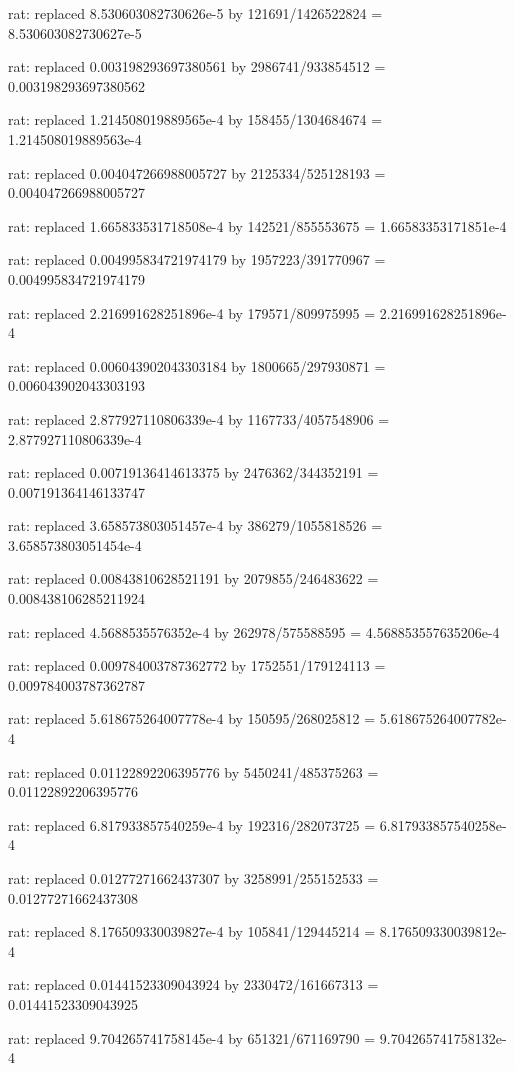 \documentclass[a4paper,10pt]{article}
\begin{document}
\begin{eulernotebook}
\begin{eulercomment}
\begin{eulercomment}
\begin{eulercomment}
\begin{eulercomment}
\begin{eulercomment}
\begin{eulercomment}
\begin{eulercomment}
\begin{eulercomment}
\begin{eulercomment}
\begin{eulercomment}
\begin{eulercomment}
\begin{eulercomment}
\begin{eulercomment}
\begin{eulercomment}
\begin{eulercomment}
\begin{eulercomment}
\begin{euleroutput}
  rat: replaced 8.530603082730626e-5 by 121691/1426522824 = 8.530603082730627e-5
  
  rat: replaced 0.003198293697380561 by 2986741/933854512 = 0.003198293697380562
  
  rat: replaced 1.214508019889565e-4 by 158455/1304684674 = 1.214508019889563e-4
  
  rat: replaced 0.004047266988005727 by 2125334/525128193 = 0.004047266988005727
  
  rat: replaced 1.665833531718508e-4 by 142521/855553675 = 1.66583353171851e-4
  
  rat: replaced 0.004995834721974179 by 1957223/391770967 = 0.004995834721974179
  
  rat: replaced 2.216991628251896e-4 by 179571/809975995 = 2.216991628251896e-4
  
  rat: replaced 0.006043902043303184 by 1800665/297930871 = 0.006043902043303193
  
  rat: replaced 2.877927110806339e-4 by 1167733/4057548906 = 2.877927110806339e-4
  
  rat: replaced 0.00719136414613375 by 2476362/344352191 = 0.007191364146133747
  
  rat: replaced 3.658573803051457e-4 by 386279/1055818526 = 3.658573803051454e-4
  
  rat: replaced 0.00843810628521191 by 2079855/246483622 = 0.008438106285211924
  
  rat: replaced 4.5688535576352e-4 by 262978/575588595 = 4.568853557635206e-4
  
  rat: replaced 0.009784003787362772 by 1752551/179124113 = 0.009784003787362787
  
  rat: replaced 5.618675264007778e-4 by 150595/268025812 = 5.618675264007782e-4
  
  rat: replaced 0.01122892206395776 by 5450241/485375263 = 0.01122892206395776
  
  rat: replaced 6.817933857540259e-4 by 192316/282073725 = 6.817933857540258e-4
  
  rat: replaced 0.01277271662437307 by 3258991/255152533 = 0.01277271662437308
  
  rat: replaced 8.176509330039827e-4 by 105841/129445214 = 8.176509330039812e-4
  
  rat: replaced 0.01441523309043924 by 2330472/161667313 = 0.01441523309043925
  
  rat: replaced 9.704265741758145e-4 by 651321/671169790 = 9.704265741758132e-4
  

\end{euleroutput}
\end{eulercomment}
\end{eulercomment}
\end{eulercomment}
\end{eulercomment}
\end{eulercomment}
\end{eulercomment}
\end{eulercomment}
\end{eulercomment}
\end{eulercomment}
\end{eulercomment}
\end{eulercomment}
\end{eulercomment}
\end{eulercomment}
\end{eulercomment}
\end{eulercomment}
\end{eulercomment}
\end{eulernotebook}
\end{document}
